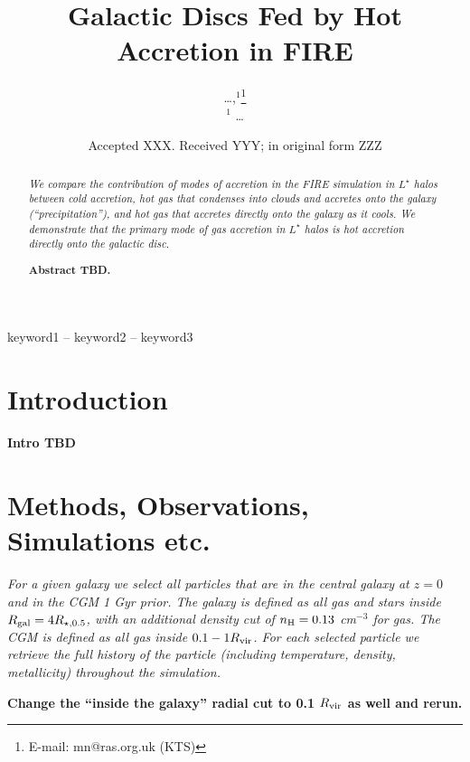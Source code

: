 \documentclass[fleqn,usenatbib]{mnras}
\title[Hot Accretion in FIRE]{Galactic Discs Fed by Hot Accretion in FIRE}
\author[\ldots]{
\ldots,$^{1}$\thanks{E-mail: mn@ras.org.uk (KTS)}
\\
$^1$ \ldots
}
\date{Accepted XXX. Received YYY; in original form ZZZ}
\begin{document}
\label{firstpage}
\pagerange{\pageref{firstpage}--\pageref{lastpage}}
\maketitle

\begin{abstract}
\textit{
We compare the contribution of modes of accretion in the FIRE simulation in $L^\star$ halos between cold accretion, hot gas that condenses into clouds and accretes onto the galaxy (``precipitation''), and hot gas that accretes directly onto the galaxy as it cools.
We demonstrate that the primary mode of gas accretion in $L^\star$ halos is hot accretion directly onto the galactic disc.
}

\textbf{Abstract TBD.}
\end{abstract}

\begin{keywords}
keyword1 -- keyword2 -- keyword3
\end{keywords}



\section{Introduction}

\textbf{Intro TBD}

\section{Methods, Observations, Simulations etc.}



\textit{
For a given galaxy we select all particles that are in the central galaxy at $z=0$ and in the CGM 1 Gyr prior.
The galaxy is defined as all gas and stars inside $R_{\rm gal} = 4 R_{\star,0.5}$, with an additional density cut of $n_{\rm H} = 0.13$ cm$^{-3}$ for gas.
The CGM is defined as all gas inside $0.1 -1 R_{\rm vir}$.
For each selected particle we retrieve the full history of the particle (including temperature, density, metallicity) throughout the simulation.
}

\textbf{Change the ``inside the galaxy'' radial cut to 0.1 $R_{\rm vir}$ as well and rerun.}
\end{document}

